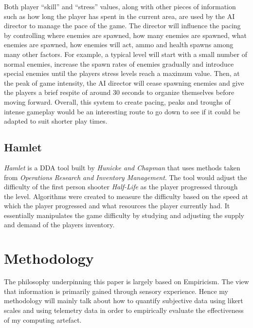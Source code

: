 \documentclass[journal]{IEEEtran}
\begin{document}
Both player ``skill'' and ``stress'' values, along with other pieces of information such as how long the player has spent in the current area, are used by the AI director to manage the pace of the game. The director will influence the pacing by controlling where enemies are spawned, how many enemies are spawned, what enemies are spawned, how enemies will act, ammo and health spawns among many other factors. For example, a typical level will start with a small number of normal enemies, increase the spawn rates of enemies gradually and introduce special enemies until the players stress levels reach a maximum value. Then, at the peak of game intensity, the AI director will cease spawning enemies and give the players a brief respite of around 30 seconds to organize themselves before moving forward.
Overall, this system to create pacing, peaks and troughs of intense gameplay would be an interesting route to go down to see if it could be adapted to suit shorter play times. 
 
\subsection{Hamlet}
\textit{Hamlet} \cite{hunicke2005case} is a DDA tool built by \textit{Hunicke and Chapman} that uses methods taken from \textit{Operations Research and Inventory Management}. The tool would adjust the difficulty of the first person shooter \textit{Half-Life} \cite{game:halflife} as the player progressed through the level. Algorithms were created to measure the difficulty based on the speed at which the player progressed and what resources the player currently had. It essentially manipulates the game difficulty by studying and adjusting the supply and demand of the players inventory.


\section{Methodology}
The philosophy underpinning this paper is largely based on Empiricism. The view that information is primarily gained through sensory experience. Hence my methodology will mainly talk about how to quantify subjective data using likert scales and using telemetry data in order to empirically evaluate the effectiveness of my computing artefact.
\end{document}
